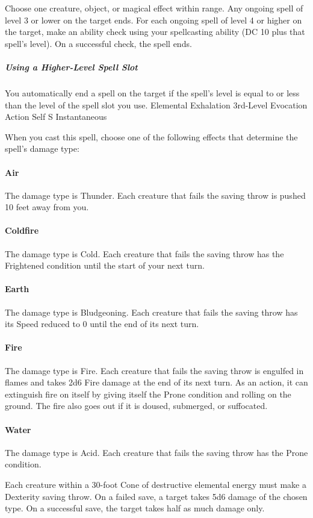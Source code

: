 \documentclass[letterpaper,openany,oneside,twocolumn]{book}
\begin{document}
Choose one creature, object, or magical effect within range. Any ongoing spell of level 3 or lower on the target ends. For each ongoing spell of level 4 or higher on the target, make an ability check using your spellcasting ability (DC 10 plus that spell's level). On a successful check, the spell ends.

\subparagraph*{Using a Higher-Level Spell Slot} You automatically end a spell on the target if the spell's level is equal to or less than the level of the spell slot you use.
\DndSpellHeader
  {Elemental Exhalation}
  {3rd-Level Evocation}
  {Action}
  {Self}
  {S}
  {Instantaneous}

When you cast this spell, choose one of the following effects that determine the spell's damage type:
\paragraph{Air} The damage type is Thunder. Each creature that fails the saving throw is pushed 10 feet away from you.
\paragraph{Coldfire} The damage type is Cold. Each creature that fails the saving throw has the Frightened condition until the start of your next turn.
\paragraph{Earth} The damage type is Bludgeoning. Each creature that fails the saving throw has its Speed reduced to 0 until the end of its next turn.
\paragraph{Fire} The damage type is Fire. Each creature that fails the saving throw is engulfed in flames and takes 2d6 Fire damage at the end of its next turn. As an action, it can extinguish fire on itself by giving itself the Prone condition and rolling on the ground. The fire also goes out if it is doused, submerged, or suffocated.
\paragraph{Water} The damage type is Acid. Each creature that fails the saving throw has the Prone condition.

Each creature within a 30-foot Cone of destructive elemental energy must make a Dexterity saving throw. On a failed save, a target takes 5d6 damage of the chosen type. On a successful save, the target takes half as much damage only.
\end{document}
